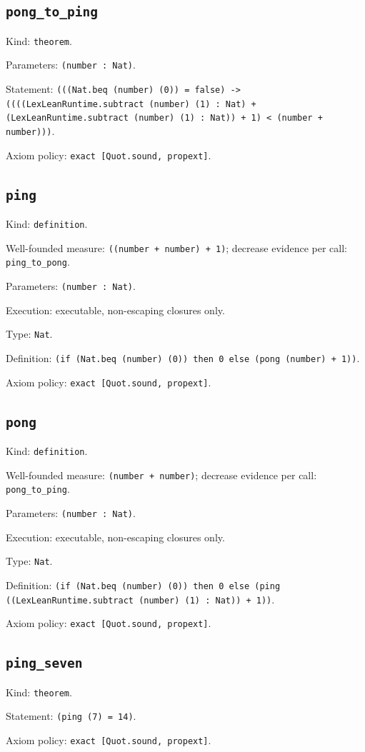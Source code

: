 \documentclass[11pt]{article}
\begin{document}
\subsection*{\texttt{pong\_to\_ping}}
\noindent Kind: \texttt{theorem}.\par
\noindent Parameters: \texttt{(number : Nat)}.\par
\noindent Statement: \texttt{(((Nat.beq (number) (0)) = false) -> ((((LexLeanRuntime.subtract (number) (1) : Nat) + (LexLeanRuntime.subtract (number) (1) : Nat)) + 1) < (number + number)))}.\par
\noindent Axiom policy: \texttt{exact [Quot.sound, propext]}.\par
\subsection*{\texttt{ping}}
\noindent Kind: \texttt{definition}.\par
\noindent Well-founded measure: \texttt{((number + number) + 1)}; decrease evidence per call: \texttt{ping\_to\_pong}.\par
\noindent Parameters: \texttt{(number : Nat)}.\par
\noindent Execution: executable, non-escaping closures only.\par
\noindent Type: \texttt{Nat}.\par
\noindent Definition: \texttt{(if (Nat.beq (number) (0)) then 0 else (pong (number) + 1))}.\par
\noindent Axiom policy: \texttt{exact [Quot.sound, propext]}.\par
\subsection*{\texttt{pong}}
\noindent Kind: \texttt{definition}.\par
\noindent Well-founded measure: \texttt{(number + number)}; decrease evidence per call: \texttt{pong\_to\_ping}.\par
\noindent Parameters: \texttt{(number : Nat)}.\par
\noindent Execution: executable, non-escaping closures only.\par
\noindent Type: \texttt{Nat}.\par
\noindent Definition: \texttt{(if (Nat.beq (number) (0)) then 0 else (ping ((LexLeanRuntime.subtract (number) (1) : Nat)) + 1))}.\par
\noindent Axiom policy: \texttt{exact [Quot.sound, propext]}.\par
\subsection*{\texttt{ping\_seven}}
\noindent Kind: \texttt{theorem}.\par
\noindent Statement: \texttt{(ping (7) = 14)}.\par
\noindent Axiom policy: \texttt{exact [Quot.sound, propext]}.\par
\end{document}

